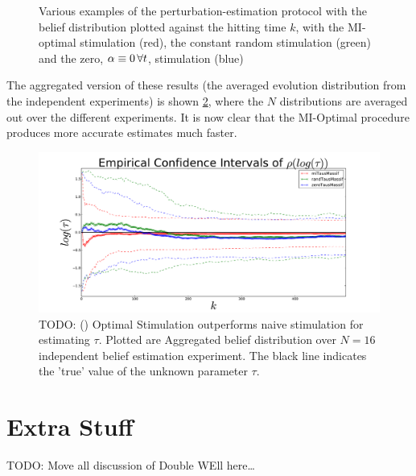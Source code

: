 \begin{figure}[h]
\begin{center}
{}
\caption[labelInTOC]{Various examples of the perturbation-estimation protocol
with the belief distribution plotted against the hitting time $k$,  with the
MI-optimal stimulation (red), the constant random stimulation (green) and the zero, $\alpha\equiv 0\,\forall t$, stimulation (blue)}
\label{fig:online_optimization_more_examples}
\end{center}
\end{figure} 

The aggregated version of these results (the averaged evolution distribution
from the independent experiments) is shown
\cref{fig:online_optimization_aggregated_belief_evolution}, where the $N$
distributions are averaged out over the different experiments. It is now clear 
that the MI-Optimal procedure produces more accurate estimates much faster.
 \begin{figure}[htp]
\begin{center}
  \includegraphics[width=\textwidth]{Figs/HTOnlineEstimator/aggregated_belief_distn_aggregated_ensemble_distn_evolution.pdf}
  \caption[Aggregated belief distribution vs. experiment hitting time index]
  {TODO: () Optimal Stimulation outperforms naive stimulation for estimating 
  $\tau$. Plotted are  Aggregated belief distribution over $N=16$
  independent belief estimation experiment. The black line indicates the 'true' value of the unknown parameter $\tau$. } 
  \label{fig:online_optimization_aggregated_belief_evolution}
\end{center}
\end{figure}

\clearpage



\section{Extra Stuff}
TODO: Move all discussion of Double WEll here\ldots


 
\clearpage